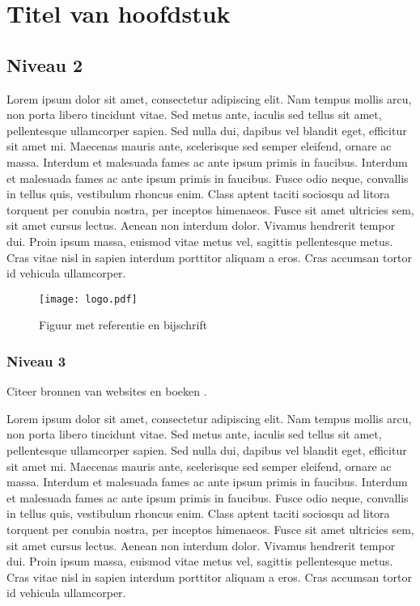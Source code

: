 
\section{Titel van hoofdstuk} %
\label{sec:titel}

\subsection{Niveau 2} %
\label{sub:subsection}

Lorem ipsum dolor sit amet, consectetur adipiscing elit. Nam tempus mollis arcu, non porta libero tincidunt vitae. Sed metus ante, iaculis sed tellus sit amet, pellentesque ullamcorper sapien. Sed nulla dui, dapibus vel blandit eget, efficitur sit amet mi. Maecenas mauris ante, scelerisque sed semper eleifend, ornare ac massa. Interdum et malesuada fames ac ante ipsum primis in faucibus. Interdum et malesuada fames ac ante ipsum primis in faucibus. Fusce odio neque, convallis in tellus quis, vestibulum rhoncus enim. Class aptent taciti sociosqu ad litora torquent per conubia nostra, per inceptos himenaeos. Fusce sit amet ultricies sem, sit amet cursus lectus. Aenean non interdum dolor. Vivamus hendrerit tempor dui. Proin ipsum massa, euismod vitae metus vel, sagittis pellentesque metus. Cras vitae nisl in sapien interdum porttitor aliquam a eros. Cras accumsan tortor id vehicula ullamcorper.

\begin{figure}[H]
  \label{figure:golden-circle}
  \centering
  \texttt{[image: logo.pdf]}
  \caption{Figuur met referentie en bijschrift \cite{voorbeeld-ref}}
\end{figure}

\subsubsection{Niveau 3}

Citeer bronnen van websites \cite{voorbeeld-ref} en boeken \cite{boek-ref}.

Lorem ipsum dolor sit amet, consectetur adipiscing elit. Nam tempus mollis arcu, non porta libero tincidunt vitae. Sed metus ante, iaculis sed tellus sit amet, pellentesque ullamcorper sapien. Sed nulla dui, dapibus vel blandit eget, efficitur sit amet mi. Maecenas mauris ante, scelerisque sed semper eleifend, ornare ac massa. Interdum et malesuada fames ac ante ipsum primis in faucibus. Interdum et malesuada fames ac ante ipsum primis in faucibus. Fusce odio neque, convallis in tellus quis, vestibulum rhoncus enim. Class aptent taciti sociosqu ad litora torquent per conubia nostra, per inceptos himenaeos. Fusce sit amet ultricies sem, sit amet cursus lectus. Aenean non interdum dolor. Vivamus hendrerit tempor dui. Proin ipsum massa, euismod vitae metus vel, sagittis pellentesque metus. Cras vitae nisl in sapien interdum porttitor aliquam a eros. Cras accumsan tortor id vehicula ullamcorper.


